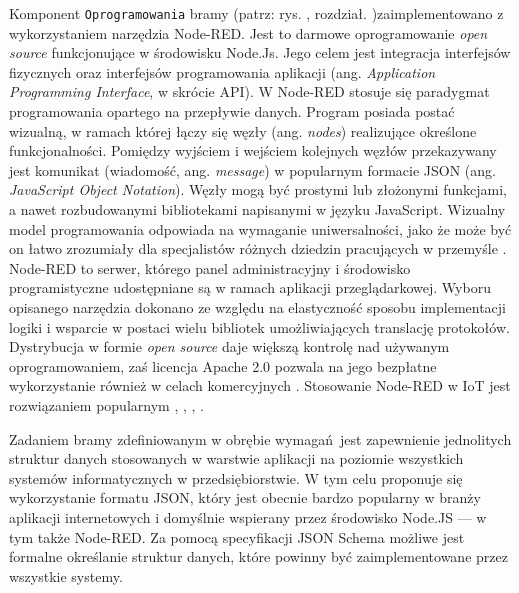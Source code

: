 \documentclass[a4paper, 12pt, twoside]{article}
\begin{document}
Komponent \texttt{Oprogramowania} bramy (patrz: rys. , rozdział. )zaimplementowano z wykorzystaniem
narzędzia Node-RED. Jest to darmowe oprogramowanie \emph{open source} funkcjonujące
w środowisku Node.Js. Jego celem jest integracja interfejsów
fizycznych oraz interfejsów programowania aplikacji
(ang. \emph{Application Programming Interface}, w skrócie API).
W Node-RED stosuje się paradygmat programowania opartego na przepływie danych.
Program posiada postać wizualną, w ramach której łączy się węzły (ang. \emph{nodes})
realizujące określone funkcjonalności. Pomiędzy wyjściem i wejściem kolejnych
węzłów przekazywany jest komunikat (wiadomość, ang. \emph{message}) w popularnym formacie
JSON (ang. \emph{JavaScript Object Notation}). Węzły mogą być prostymi lub złożonymi
funkcjami, a nawet rozbudowanymi bibliotekami napisanymi w języku JavaScript.
Wizualny model programowania odpowiada na wymaganie uniwersalności,
jako że może być on łatwo zrozumiały dla specjalistów różnych dziedzin pracujących w przemyśle
\cite{flow-programming}.
Node-RED to serwer, którego panel administracyjny i środowisko programistyczne
udostępniane są w ramach aplikacji przeglądarkowej. Wyboru opisanego
narzędzia dokonano ze względu na elastyczność sposobu implementacji logiki i
wsparcie w postaci wielu bibliotek umożliwiających translację protokołów.
Dystrybucja w formie \emph{open source} daje większą kontrolę nad używanym oprogramowaniem,
zaś licencja Apache 2.0 pozwala na jego bezpłatne wykorzystanie również
w celach komercyjnych \cite{node-red}. Stosowanie Node-RED w IoT jest rozwiązaniem popularnym \cite{iot-gateway-medical-and-industrial},
\cite{design-impl-node-gateway}, \cite{iiot-opensource-gateway}, \cite{low-cost-esp32-pi-node-red-scada}.

Zadaniem bramy zdefiniowanym w obrębie wymagań jest zapewnienie jednolitych
struktur danych stosowanych w warstwie aplikacji na poziomie wszystkich
systemów informatycznych w przedsiębiorstwie. W tym celu proponuje się
wykorzystanie formatu JSON, który jest obecnie bardzo popularny w branży
aplikacji internetowych i domyślnie wspierany przez środowisko Node.JS --- w tym
także Node-RED. Za pomocą specyfikacji JSON Schema możliwe jest
formalne określanie struktur danych, które powinny być zaimplementowane przez
wszystkie systemy.
\end{document}
